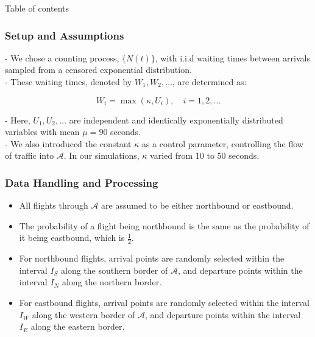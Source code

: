 \documentclass[UKenglish]{beamer}
\begin{document}
\begin{frame}[allowframebreaks]{Table of contents}
    \tableofcontents[currentsection, hideothersubsections, subsubsectionstyle=show/show/show/hide]   
\end{frame}
\begin{frame}
\frametitle{Setup and Assumptions}
\vspace{5mm}
- We chose a counting process, \( \{N(t)\} \), with i.i.d waiting times between arrivals sampled from a censored exponential distribution.
\vspace{3mm} \\
- These waiting times, denoted by \( W_1, W_2, \ldots \), are determined as:

\[ W_i = \max(\kappa, U_i), \quad i = 1, 2, \ldots \]

- Here, \( U_1, U_2, \ldots \) are independent and identically exponentially distributed variables with mean $\mu = 90 $ seconds. \vspace{3mm}\\

- We also introduced the constant \( \kappa \) as a control parameter, controlling the flow of traffic into \( \mathcal{A} \). In our simulations, \( \kappa \) varied from 10 to 50 seconds.
\end{frame}
\begin{frame}
\frametitle{Data Handling and Processing}
\vspace{5mm}
\begin{itemize}
    \item All flights through $\mathcal{A}$ are assumed to be either northbound or eastbound.
    \vspace{3mm}
    \item The probability of a flight being northbound is the same as the probability of it being eastbound, which is $\frac{1}{2}$.
    \vspace{3mm}
    \item For northbound flights, arrival points are randomly selected within the interval $I_S$ along the southern border of $\mathcal{A}$, and departure points within the interval $I_N$ along the northern border.
    \vspace{3mm}
    \item For eastbound flights, arrival points are randomly selected within the interval $I_W$ along the western border of $\mathcal{A}$, and departure points within the interval $I_E$ along the eastern border.
\end{itemize}
\end{frame}
\end{document}
